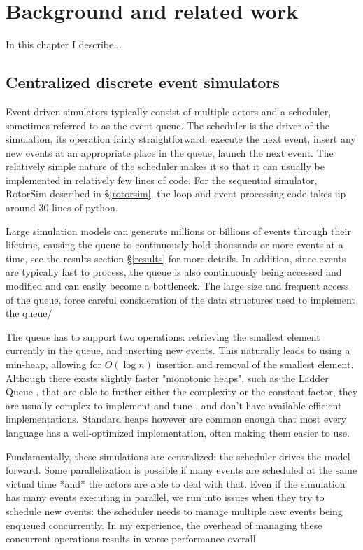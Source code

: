 \chapter{Background and related work} \label{background}

In this chapter I describe...

\section{Centralized discrete event simulators} \label{centralized-sim}

Event driven simulators typically consist of multiple actors and a scheduler, sometimes referred to as the event queue. %
The scheduler is the driver of the simulation, its operation fairly straightforward: execute the next event, insert any new events at an appropriate place in the queue, launch the next event.
The relatively simple nature of the scheduler makes it so that it can usually be implemented in relatively few lines of code.
For the sequential simulator, RotorSim\cite{brode-roger_nibriviarotorsim_2020} described in \S \ref{rotorsim}, the loop and event processing code takes up around 30 lines of python.

Large simulation models can generate millions or billions of events through their lifetime, causing the queue to continuously hold thousands or more events at a time, see the results section \S\ref{results} for more details.
In addition, since events are typically fast to process, the queue is also continuously being accessed and modified and can easily become a bottleneck.
The large size and frequent access of the queue, force careful consideration of the data structures used to implement the queue/

The queue has to support two operations: retrieving the smallest element currently in the queue, and inserting new events.
This naturally leads to using a min-heap, allowing for $O\left(\log n\right)$ insertion and removal of the smallest element.
Although there exists slightly faster "monotonic heaps", such as the Ladder Queue \cite{tang_ladder_2005}, that are able to further either the complexity or the constant factor, they are usually complex to implement and tune \cite{furfaro_adaptive_2018}, and don't have available efficient implementations.
Standard heaps however are common enough that most every language has a well-optimized implementation, often making them easier to use.

Fundamentally, these simulations are centralized: the scheduler drives the model forward.
Some parallelization is possible if many events are scheduled at the same virtual time *and* the actors are able to deal with that.
Even if the simulation has many events executing in parallel, we run into issues when they try to schedule new events: the scheduler needs to manage multiple new events being enqueued concurrently.
In my experience, the overhead of managing these concurrent operations results in worse performance overall.

